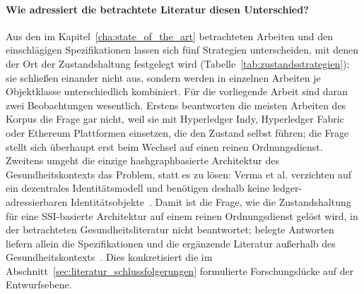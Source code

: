 \paragraph{Wie adressiert die betrachtete Literatur diesen Unterschied?}
Aus den im Kapitel~\ref{cha:state_of_the_art} betrachteten Arbeiten und den einschlägigen Spezifikationen lassen sich fünf Strategien unterscheiden, mit denen der Ort der Zustandshaltung festgelegt wird (Tabelle~\ref{tab:zustandsstrategien}); sie schließen einander nicht aus, sondern werden in einzelnen Arbeiten je Objektklasse unterschiedlich kombiniert. Für die vorliegende Arbeit sind daran zwei Beobachtungen wesentlich. Erstens beantworten die meisten Arbeiten des Korpus die Frage gar nicht, weil sie mit Hyperledger Indy, Hyperledger Fabric oder Ethereum Plattformen einsetzen, die den Zustand selbst führen; die Frage stellt sich überhaupt erst beim Wechsel auf einen reinen Ordnungsdienst. Zweitens umgeht die einzige hashgraphbasierte Architektur des Gesundheitskontexts das Problem, statt es zu lösen: Verma et al. verzichten auf ein dezentrales Identitätsmodell und benötigen deshalb keine ledger-adressierbaren Identitätsobjekte~\cite{verma2024}. Damit ist die Frage, wie die Zustandshaltung für eine SSI-basierte Architektur auf einem reinen Ordnungsdienst gelöst wird, in der betrachteten Gesundheitsliteratur nicht beantwortet; belegte Antworten liefern allein die Spezifikationen und die ergänzende Literatur außerhalb des Gesundheitskontexts~\cite{bairdgross2019, hasheddidmethod, satybaldy2026}. Dies konkretisiert die im Abschnitt~\ref{sec:literatur_schlussfolgerungen} formulierte Forschungslücke auf der Entwurfsebene.

